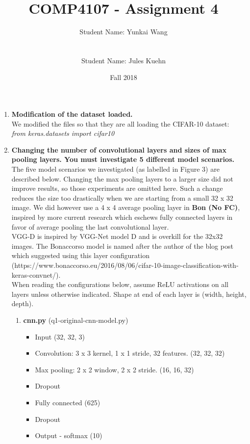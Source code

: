 \documentclass[11pt]{article}
\title{COMP4107 - Assignment 4}
\author{Student Name: Yunkai Wang\\
\text{Student Number: 100968473}\\\\
Student Name: Jules Kuehn\\
\text{Student Number: 100661464}}
\date{Fall 2018}
\begin{document}
\maketitle

\begin{enumerate}
\item \textbf{Modification of the dataset loaded.}\\
We modified the files so that they are all loading the CIFAR-10 dataset:\\
\textit{from keras.datasets import cifar10}
\item \textbf{Changing the number of convolutional layers and sizes of max pooling layers. You must investigate 5 different model scenarios.}\\
The five model scenarios we investigated (as labelled in Figure 3) are described below.
Changing the max pooling layers to a larger size did not improve results, so those experiments are omitted here. Such a change reduces the size too drastically when we are starting from a small 32 x 32 image. We did however use a 4 x 4 average pooling layer in \textbf{Bon (No FC)}, inspired by more current research which eschews fully connected layers in favor of average pooling the last convolutional layer.\\
VGG-D is inspired by VGG-Net model D and is overkill for the 32x32 images. The Bonaccorso model is named after the author of the blog post which suggested using this layer configuration (https://www.bonaccorso.eu/2016/08/06/cifar-10-image-classification-with-keras-convnet/).\\
When reading the configurations below, assume ReLU activations on all layers unless otherwise indicated. Shape at end of each layer is (width, height, depth).
    \begin{enumerate}
        \item \textbf{cnn.py} (q1-original-cnn-model.py)
            \begin{itemize}
                \item Input (32, 32, 3)
                \item Convolution: 3 x 3 kernel, 1 x 1 stride, 32 features. (32, 32, 32)
                \item Max pooling: 2 x 2 window, 2 x 2 stride. (16, 16, 32)
                \item Dropout
                \item Fully connected (625)
                \item Dropout
                \item Output - softmax (10)

\end{itemize}
\end{enumerate}
\end{enumerate}
\end{document}
